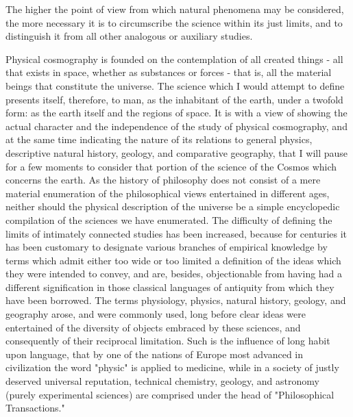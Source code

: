 The higher the point of view from which natural phenomena may be considered, the more necessary it is to circumscribe the science within its just limits, and to distinguish it from all other analogous or auxiliary studies.

Physical cosmography is founded on the contemplation of all created things - all that exists in space, whether as substances or forces - that is, all the material beings that constitute the universe. The science which I would attempt to define presents itself, therefore, to man, as the inhabitant of the earth, under a twofold form: as the earth itself and the regions of space. It is with a view of showing the actual character and the independence of the study of physical cosmography, and at the same time indicating the nature of its relations to general physics, descriptive natural history, geology, and comparative geography, that I will pause for a few moments to consider that portion of the science of the Cosmos which concerns the earth. As the history of philosophy does not consist of a mere material enumeration of the philosophical views entertained in different ages, neither should the physical description of the universe be a simple encyclopedic compilation of the sciences we have enumerated. The difficulty of defining the limits of intimately connected studies has been increased, because for centuries it has been customary to designate various branches of empirical knowledge by terms which admit either too wide or too limited a definition of the ideas which they were intended to convey, and are, besides, objectionable from having had a different signification in those classical languages of antiquity from which they have been borrowed. The terms physiology, physics, natural history, geology, and geography arose, and were commonly used, long before clear ideas were entertained of the diversity of objects embraced by these sciences, and consequently of their reciprocal limitation. Such is the influence of long habit upon language, that by one of the nations of Europe most advanced in civilization the word "physic" is applied to medicine, while in a society of justly deserved universal reputation, technical chemistry, geology, and astronomy (purely experimental sciences) are comprised under the head of "Philosophical Transactions."

